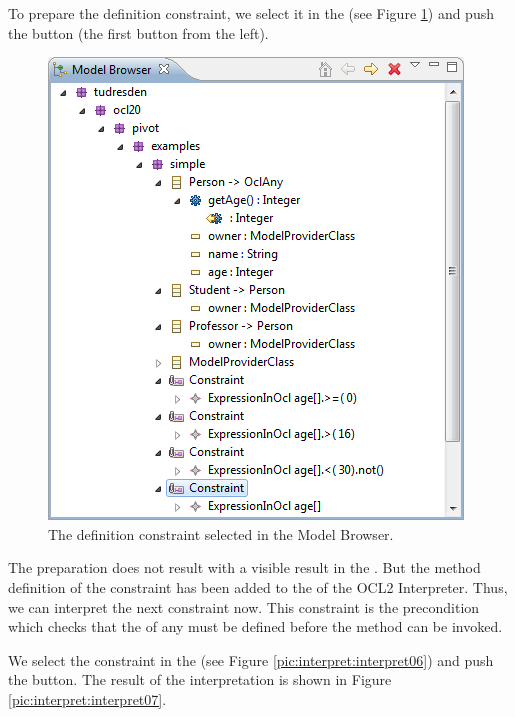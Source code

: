 To prepare the definition constraint, we select it in the  (see Figure \ref{pic:interpret:interpret05}) and push the  button (the first button from the left).

\begin{figure}[!b]
	\centering
	\includegraphics[width=0.6\linewidth]{figures/interpreter/interpret05}
	\caption{The definition constraint selected in the Model Browser.}
	\label{pic:interpret:interpret05}
\end{figure}

The preparation does not result with a visible result in the . But the method definition of the constraint has been added to the  of the \acs{OCL}2 Interpreter. Thus, we can interpret the next constraint now. This constraint is the precondition which checks that the  of any  must be defined before the method  can be invoked.

We select the constraint in the  (see Figure \ref{pic:interpret:interpret06}) and push the  button. The result of the interpretation is shown in Figure \ref{pic:interpret:interpret07}.

